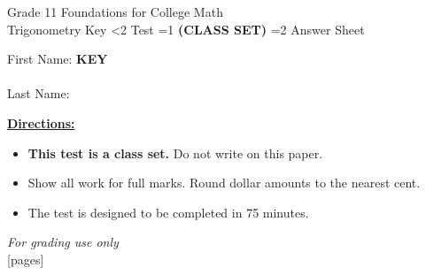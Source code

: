 \documentclass[addpoints]{exam}
\newcommand{\event}{Trigonometry}
\newcommand{\tournament}{}
\def\type{0}
\begin{document}
\begin{center}
    {\huge Grade 11 Foundations for College Math \\ \event
    \ifprintanswers \space Key
    \else \space \ifnum\type<2 Test \fi \ifnum\type=1 \textbf{(CLASS SET)} \fi
          \ifnum\type=2 Answer Sheet \fi
    \fi \\ \vspace{3mm}\tournament\vspace{1mm}}
\end{center}

\vspace{.25\textheight}

\begin{center}
    First Name: \ifprintanswers
    \underline{\hspace{3.5cm}}\textbf{KEY}\underline{\hspace{5.5cm}}\\\ \vspace{5mm}
    \else \underline{\hspace{10cm}}\\ \vspace{5mm} \fi
    Last Name: \underline{\hspace{10cm}}\\ \vspace{5mm}
\end{center}

\noindent\textbf{\underline{Directions:}}
\begin{itemize}
    \ifnum\type=1 \item \textbf{This test is a class set.} Do not write on this paper. \fi
    \item Show all work for full marks. Round dollar amounts to the nearest cent.
    \item The test is designed to be completed in 75 minutes.
\end{itemize}
\begin{center}
\textit{For grading use only}\\
[pages]
\end{center}
\end{document}
